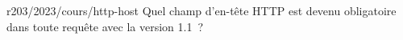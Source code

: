 \begin{question}{r203/2023/cours/http-host}
  Quel champ d'en-tête HTTP est devenu obligatoire dans toute requête
  avec la version 1.1~?
  \begin{reponses}
  \end{reponses}
\end{question}
